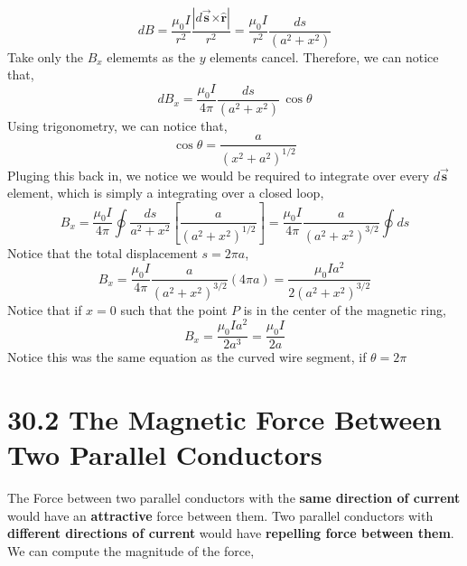 \documentclass[12pt, titlepage, oneside]{article}
\let\oldhat\hat
\let\oldvec\vec
\newcommand{\cross}{\bm{\times}}
\renewcommand{\hat}[1]{\oldhat{\mathbf{#1}}}
\renewcommand{\vec}[1]{\oldvec{\bm{#1}}}
\renewcommand{\hat}[1]{\oldhat{\bm{#1}}}
\renewcommand{\b}[1]{\textbf{#1}}
\begin{document}
\begin{equation}
dB = \frac{\mu_0 I}{r^2} \frac{|d\vec{s}\cross\hat{r}|}{r^2} = \frac{\mu_0 I}{r^2} \frac{ds}{(a^2+x^2)}
\end{equation}
Take only the $B_x$ elememts as the $y$ elements cancel. Therefore, we can notice that,
\begin{equation}
dB_x =  \frac{\mu_0 I}{4\pi} \frac{ds}{(a^2+x^2)} \,\cos\theta
\end{equation}
Using trigonometry, we can notice that,
\begin{equation}
\cos\theta = \frac{a}{(x^2+a^2)^{1/2}}
\end{equation} 
Pluging this back in, we notice we would be required to integrate over every $d\vec{s}$ element, which is simply a integrating over a closed loop,
\begin{equation}
B_x = \frac{\mu_0 I}{4\pi} \oint \frac{ds}{a^2 + x^2} \left[ \frac{a}{(a^2+x^2)^{1/2}} \right] = \frac{\mu_0 I}{4\pi} \frac{a}{(a^2+x^2)^{3/2}} \oint ds	
\end{equation}
Notice that the total displacement $s = 2\pi a$,
\begin{equation}
B_x = \frac{\mu_0 I}{4\pi} \frac{a}{(a^2+x^2)^{3/2}}(4\pi a) = \frac{\mu_0 I a^2}{2(a^2+x^2)^{3/2}}
\end{equation}
Notice that if $x = 0$ such that the point $P$ is in the center of the magnetic ring,
\begin{equation}
B_x = \frac{\mu_0 I a^2}{2a^3} = \frac{\mu_0 I}{2a}
\end{equation}
Notice this was the same equation as the curved wire segment, if $\theta = 2\pi$ 


\section*{30.2 The Magnetic Force Between Two Parallel Conductors}  
The Force between two parallel conductors with the \b{same direction of current} would have an \b{attractive} force between them. Two parallel conductors with \b{different directions of current} would have \b{repelling force between them}. We can compute the magnitude of the force,
\end{document}
